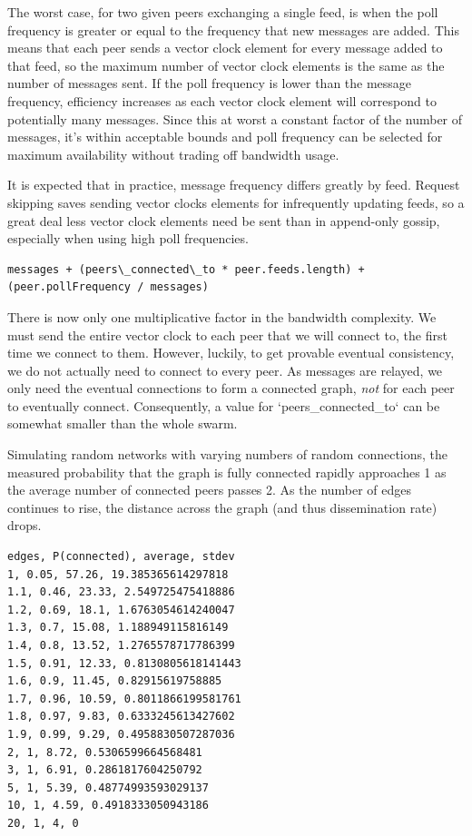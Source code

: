 \documentclass[sigconf]{acmart}
\begin{document}
The worst case, for two given peers exchanging a single feed, is when
the poll frequency is greater or equal to the frequency that new
messages are added. This means that each peer sends a vector clock
element for every message added to that feed, so the maximum number of
vector clock elements is the same as the number of messages sent. If
the poll frequency is lower than the message frequency, efficiency
increases as each vector clock element will correspond to potentially
many messages. Since this at worst a constant factor of the number of
messages, it's within acceptable bounds and poll frequency can be
selected for maximum availability without trading off bandwidth usage.

It is expected that in practice, message frequency differs greatly by
feed.  Request skipping saves sending vector clocks elements for
infrequently updating feeds, so a great deal less vector clock
elements need be sent than in append-only gossip, especially when
using high poll frequencies.

\begin{verbatim}
messages + (peers\_connected\_to * peer.feeds.length) + (peer.pollFrequency / messages)
\end{verbatim}

There is now only one multiplicative factor in the bandwidth
complexity.  We must send the entire vector clock to each peer that we
will connect to, the first time we connect to them. However, luckily,
to get provable eventual consistency, we do not actually need to
connect to every peer. As messages are relayed, we only need the
eventual connections to form a connected graph, {\em not} for each
peer to eventually connect. Consequently, a value for
`peers\_connected\_to` can be somewhat smaller than the whole swarm.

Simulating random networks with varying numbers of random connections,
the measured probability that the graph is fully connected rapidly
approaches 1 as the average number of connected peers passes 2. As the
number of edges continues to rise, the distance across the graph (and
thus dissemination rate) drops.

\begin{verbatim}
edges, P(connected), average, stdev
1, 0.05, 57.26, 19.385365614297818
1.1, 0.46, 23.33, 2.549725475418886
1.2, 0.69, 18.1, 1.6763054614240047
1.3, 0.7, 15.08, 1.188949115816149
1.4, 0.8, 13.52, 1.2765578717786399
1.5, 0.91, 12.33, 0.8130805618141443
1.6, 0.9, 11.45, 0.82915619758885
1.7, 0.96, 10.59, 0.8011866199581761
1.8, 0.97, 9.83, 0.6333245613427602
1.9, 0.99, 9.29, 0.4958830507287036
2, 1, 8.72, 0.5306599664568481
3, 1, 6.91, 0.2861817604250792
5, 1, 5.39, 0.48774993593029137
10, 1, 4.59, 0.4918333050943186
20, 1, 4, 0
\end{verbatim}
\end{document}
